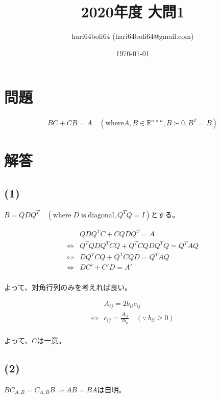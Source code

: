 \documentclass[a4paper, 10pt, dvipdfmx]{jlreq}
\begin{document}
\title{2020年度 大問1}
\author{hari64boli64 (hari64boli64@gmail.com)}
\date{\today}
\maketitle


\section{問題}

\begin{align*}
    BC+CB=A \quad (\mathrm{where} A,B \in \mathbb{R}^{n\times n}, B\succ 0, B^T=B)
\end{align*}

\section{解答}

\subsection*{(1)}

$B=QDQ^T \quad (\mathrm{where} \; D \; \mathrm{is}\; \mathrm{diagonal}, Q^TQ=I)$とする。

\begin{align*}
                    & QDQ^TC+CQDQ^T=A             \\
    \Leftrightarrow & Q^TQDQ^TCQ+Q^TCQDQ^TQ=Q^TAQ \\
    \Leftrightarrow & DQ^TCQ+Q^TCQD=Q^TAQ         \\
    \Leftrightarrow & DC'+C'D=A'                  \\
\end{align*}

よって、対角行列のみを考えれば良い。

\begin{align*}
                    & A_{ij}=2b_{ii}c_{ij}                                           \\
    \Leftrightarrow & c_{ij}=\frac{A_{ij}}{2b_{ii}}\quad (\because \; b_{ii} \geq 0) \\
\end{align*}

よって、$C$は一意。

\subsection*{(2)}

$BC_{A,B}=C_{A,B}B \Rightarrow AB=BA$は自明。
\end{document}
